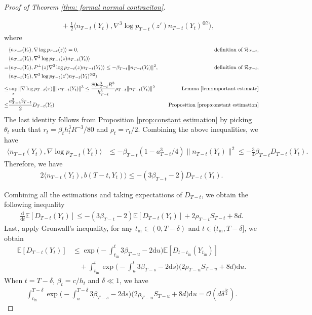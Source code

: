 \documentclass[11pt]{article}
\newcommand{\mb}{\mathbb}
\newcommand{\dee}{\mathrm{d}}
\newcommand{\mc}{\mathcal}
\newcommand{\tin}{t_{\mathrm{in}}}
\begin{document}
\begin{proof}[Proof of Theorem \ref{thm: formal normal contraciton}]
\begin{itemize}
\begin{align*}
        & \quad  + \frac{1}{2}\langle  n_{T-t}(Y_t) ,  \nabla^3\log p_{T-t}(z') n_{T-t}(Y_t)^{\otimes 2} \rangle ,
    \end{align*}
    where
    \begin{align*}
       & \langle  n_{T-t}(Y_t) ,  \nabla\log p_{T-t}(z) \rangle = 0 ,\quad &\text{definition of }\mc{R}_{T-t},\\
       & \langle  n_{T-t}(Y_t) ,  \nabla^2\log p_{T-t}(z) n_{T-t}(Y_t) \rangle  \quad & \\
       = & \langle  n_{T-t}(Y_t) ,  P^\perp(z)\nabla^2\log p_{T-t}(z) n_{T-t}(Y_t) \rangle \le  -\beta_{T-t}\| n_{T-t}(Y_t) \|^2, \quad & \text{definition of }\mc{R}_{T-t},\\ 
       &\langle  n_{T-t}(Y_t) ,  \nabla^3\log p_{T-t}(z') n_{T-t}(Y_t)^{\otimes 2} \rangle \quad & \\
       \le & \sup_x \| \nabla \log p_{T-t}(x) \| \| n_{T-t}(Y_t) \|^3 \le  \frac{80a_{T-t}^3 R^3}{h_{T-t}^3} \rho_{T-t} \| n_{T-t}(Y_t) \|^2 \quad & \text{Lemma }\ref{lem:important estimate} \\
       \le & \frac{a_{T-t}^3\beta_{T-t}}{2} D_{T-t}(Y_t) \quad & \text{Proposition }\ref{prop:constant estimation}
    \end{align*}
    The last identity follows from Proposition \ref{prop:constant estimation} by picking $\theta_t$ such that $r_t= \beta_t h_t^3R^{-3}/80$ and $\rho_t=r_t/2$. Combining the above inequalities, we have
    \begin{align*}
        \langle  n_{T-t}(Y_t) , \nabla\log p_{T-t}(Y_t) \rangle &\le -\beta_{T-t}(1-a_{T-t}^3/4) \| n_{T-t}(Y_t) \|^2\le -\frac{3}{4}\beta_{T-t} D_{T-t}(Y_t).
    \end{align*}
    Therefore, we have
\begin{align*}
    2\langle n_{T-t}(Y_t), b(T-t,Y_t) \rangle  \le -(3\beta_{T-t}-2)D_{T-t}(Y_t).
\end{align*}
\end{itemize}
Combining all the estimations and taking expectations of $D_{T-t}$, we obtain the following inequality
\begin{align*}
    \frac{\dee}{\dee t}\mb{E}[D_{T-t}(Y_t)] \le -(3\beta_{T-t}-2)\mb{E}[D_{T-t}(Y_t)] + 2\rho_{T-t}S_{T-t} + 8d.
\end{align*}
Last, apply Gronwall's inequality, for any $\tin\in (0, T-\delta)$ and $t\in (\tin,T-\delta]$, we obtain
\begin{align*}
    \mb{E}[D_{T-t}(Y_t)] &\le \exp\big( -\int_{\tin}^t 3\beta_{T-u}-2 \dee u \big)\mb{E}[D_{t-\tin}(Y_{\tin})]  \\
    &\quad + \int_{\tin}^t \exp\big( -\int_{u}^t 3\beta_{T-s}-2 \dee s \big) \big( 2\rho_{T-u}S_{T-u} + 8d \big) \dee u .
\end{align*}
When $t=T-\delta$, $\beta_t=c/h_t$ and $\delta\ll 1$, we have
\begin{align*}
    \int_{\tin}^{T-\delta} \exp\big( -\int_{u}^{T-\delta
    } 3\beta_{T-s}-2 \dee s \big) \big( 2\rho_{T-u}S_{T-u} + 8d \big) \dee u= \mc{O}(d\delta^{\frac{3c}{2}}).
\end{align*}   


\end{proof}
\end{document}
